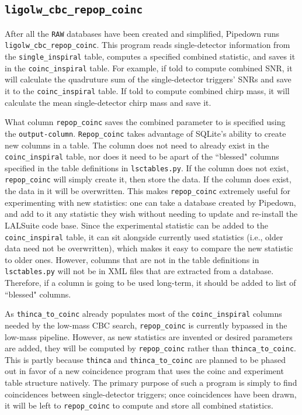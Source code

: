 \subsection{ \texttt{ligolw\_cbc\_repop\_coinc} }
\label{sec:repop_coinc}

After all the \verb|RAW| databases have been created and simplified, Pipedown
runs \verb|ligolw_cbc_repop_coinc|. This program reads single-detector
information from the \verb|single_inspiral| table, computes a specified
combined statistic, and saves it in the \verb|coinc_inspiral| table. For
example, if told to compute combined \ac{SNR}, it will calculate the quadruture
sum of the single-detector triggers' \acp{SNR} and save it to the
\verb|coinc_inspiral| table. If told to compute combined chirp mass, it will
calculate the mean single-detector chirp mass and save it.

What column \verb|repop_coinc| saves the combined parameter to is specified
using the \verb|output-column|. \verb|Repop_coinc| takes advantage of SQLite's
ability to create new columns in a table. The column does not need to already
exist in the \verb|coinc_inspiral| table, nor does it need to be apart of the
``blessed" columns specified in the table definitions in \verb|lsctables.py|.
If the column does not exist, \verb|repop_coinc| will simply create it, then
store the data. If the column does exist, the data in it will be overwritten.
This makes \verb|repop_coinc| extremely useful for experimenting with new
statistics: one can take a database created by Pipedown, and add to it any
statistic they wish without needing to update and re-install the LALSuite code
base. Since the experimental statistic can be added to the
\verb|coinc_inspiral| table, it can sit alongside currently used statistics
(i.e., older data need not be overwritten), which makes it easy to compare the
new statistic to older ones. However, columns that are not in the table
definitions in \verb|lsctables.py| will not be in XML files that are extracted
from a database. Therefore, if a column is going to be used long-term, it
should be added to list of ``blessed" columns.

As \verb|thinca_to_coinc| already populates most of the \verb|coinc_inspiral|
columns needed by the low-mass \ac{CBC} search, \verb|repop_coinc| is currently
bypassed in the low-mass pipeline. However, as new statistics are invented or
desired parameters are added, they will be computed by \verb|repop_coinc|
rather than \verb|thinca_to_coinc|. This is partly because \verb|thinca| and
\verb|thinca_to_coinc| are planned to be phased out in favor of a new
coincidence program that uses the coinc and experiment table structure
natively. The primary purpose of such a program is simply to find coincidences
between single-detector triggers; once coincidences have been drawn, it will be
left to \verb|repop_coinc| to compute and store all combined statistics.

